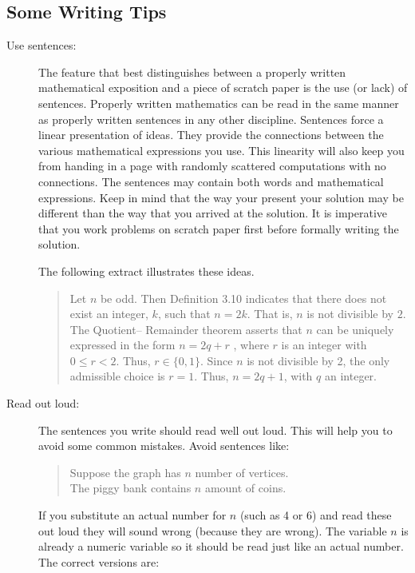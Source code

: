 \documentclass[
]{book}
\theoremstyle{definition}
\theoremstyle{definition}
\theoremstyle{definition}
\theoremstyle{remark}
\begin{document}
\hypertarget{some-writing-tips}{%
\subsection{Some Writing Tips}\label{some-writing-tips}}

\begin{description}
\item[Use sentences:]
The feature that best distinguishes between a properly written
mathematical exposition and a piece of scratch paper is the use (or
lack) of sentences. Properly written mathematics can be read in the
same manner as properly written sentences in any other discipline.
Sentences force a linear presentation of ideas. They provide the
connections between the various mathematical expressions you use.
This linearity will also keep you from handing in a page with
randomly scattered computations with no connections. The sentences
may contain both words and mathematical expressions. Keep in mind
that the way your present your solution may be different than the
way that you arrived at the solution. It is imperative that you work
problems on scratch paper first before formally writing the
solution.

The following extract illustrates these ideas.

\begin{quote}
Let \(n\) be odd. Then Definition 3.10 indicates that there does not
exist an integer, \(k\), such that \(n = 2k\). That is, \(n\) is not
divisible by \(2\). The Quotient-- Remainder theorem asserts that
\(n\) can be uniquely expressed in the form \(n = 2q + r\) , where \(r\)
is an integer with \(0 \le r < 2\). Thus, \(r \in  \{0, 1\}\). Since \(n\) is not divisible by 2, the only
admissible choice is \(r =  1\). Thus, \(n = 2q + 1\), with \(q\) an integer.
\end{quote}
\item[Read out loud:]
The sentences you write should read well out loud. This will help
you to avoid some common mistakes. Avoid sentences like:

\begin{quote}
Suppose the graph has \(n\) number of vertices.\\
The piggy bank contains \(n\) amount of coins.
\end{quote}

If you substitute an actual number for \(n\) (such as 4 or 6) and read
these out loud they will sound wrong (because they are wrong). The
variable \(n\) is already a numeric variable so it should be read just
like an actual number. The correct versions are:


\end{description}
\end{document}
